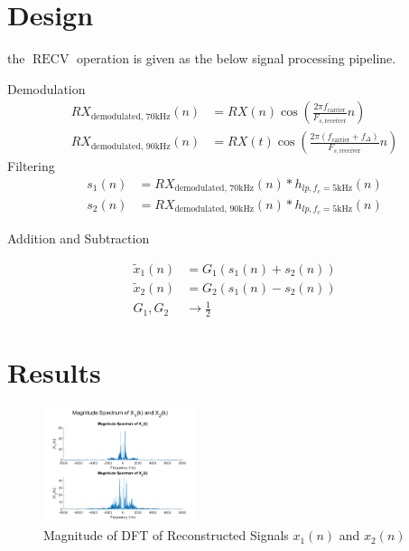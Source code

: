 \documentclass[journal]{IEEEtran}
\begin{document}
\section{Design}
the $\displaystyle \operatorname{RECV}$ operation is given as the below signal processing pipeline.



Demodulation
\begin{align*}
    RX_{\text{demodulated, 70kHz}}( n) & =RX( n)\cos\left(\frac{2\pi f_{\text{carrier}}}{F_{s,\text{receiver}}} n\right)                 \\
    RX_{\text{demodulated, 90kHz}}( n) & =RX( t)\cos\left(\frac{2\pi ( f_{\text{carrier}} +f_{\Delta })}{F_{s,\text{receiver}}} n\right)
\end{align*}
Filtering
\begin{align*}
    s_{1}( n) & =RX_{\text{demodulated, 70kHz}}( n) *h_{lp,f_{c} =5\text{kHz}}( n) \\
    s_{2}( n) & =RX_{\text{demodulated, 90kHz}}( n) *h_{lp,f_{c} =5\text{kHz}}( n)
\end{align*}


Addition and Subtraction


\begin{align*}
    \tilde{x}_{1}( n) & =G_{1}\left( s_{1}( n) +s_{2}( n)\right) \\
    \tilde{x}_{2}( n) & =G_{2}\left( s_{1}( n) -s_{2}( n)\right) \\
    G_{1} ,G_{2}      & \rightarrow \frac{1}{2}
\end{align*}
\section{Results}
\begin{figure}
    \begin{center}
        \includegraphics[width=0.4\textwidth]{freq_recon.png}
        \caption{\label{fig:freq_recon}Magnitude of DFT of Reconstructed Signals \(x_1(n)\) and \(x_2(n)\)}
    \end{center}
\end{figure}
\end{document}

